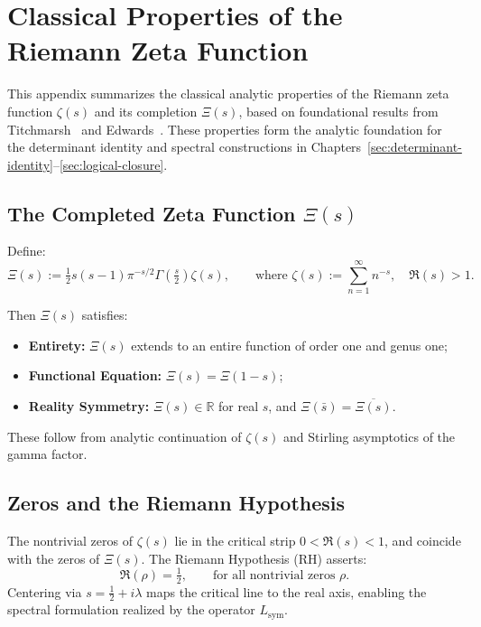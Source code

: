 \section{Classical Properties of the Riemann Zeta Function}
\label{app:zeta-function-background}

This appendix summarizes the classical analytic properties of the Riemann zeta function \( \zeta(s) \) and its completion \( \Xi(s) \), based on foundational results from Titchmarsh~\cite{Titchmarsh1986Zeta} and Edwards~\cite{Edwards1974Zeta}. These properties form the analytic foundation for the determinant identity and spectral constructions in Chapters~\ref{sec:determinant-identity}–\ref{sec:logical-closure}.

\subsection*{The Completed Zeta Function \( \Xi(s) \)}

Define:
\[
\Xi(s) := \tfrac{1}{2} s(s - 1) \pi^{-s/2} \Gamma\left( \tfrac{s}{2} \right) \zeta(s),
\qquad \text{where } \zeta(s) := \sum_{n=1}^\infty n^{-s}, \quad \Re(s) > 1.
\]

Then \( \Xi(s) \) satisfies:
\begin{itemize}
  \item \textbf{Entirety:} \( \Xi(s) \) extends to an entire function of order one and genus one;
  \item \textbf{Functional Equation:} \( \Xi(s) = \Xi(1 - s) \);
  \item \textbf{Reality Symmetry:} \( \Xi(s) \in \mathbb{R} \) for real \( s \), and \( \Xi(\bar{s}) = \overline{\Xi(s)} \).
\end{itemize}

These follow from analytic continuation of \( \zeta(s) \) and Stirling asymptotics of the gamma factor.

\subsection*{Zeros and the Riemann Hypothesis}

The nontrivial zeros of \( \zeta(s) \) lie in the critical strip \( 0 < \Re(s) < 1 \), and coincide with the zeros of \( \Xi(s) \). The Riemann Hypothesis (RH) asserts:
\[
\Re(\rho) = \tfrac{1}{2}, \qquad \text{for all nontrivial zeros } \rho.
\]
Centering via \( s = \tfrac{1}{2} + i\lambda \) maps the critical line to the real axis, enabling the spectral formulation realized by the operator \( L_{\mathrm{sym}} \).

